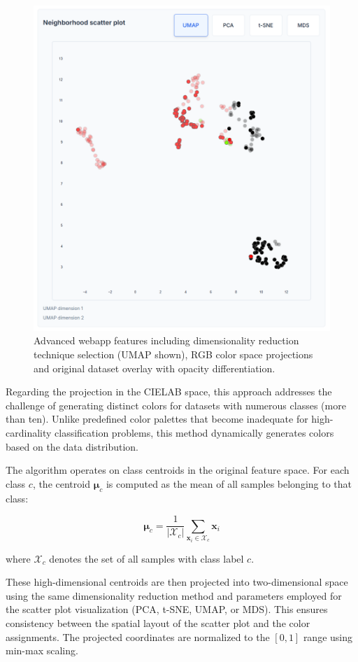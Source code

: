 \begin{figure}[h]
    \centering
    \includegraphics[width=0.6\linewidth]{images/DR switch and descendant highlight and various webapp.png}
    \caption{Advanced webapp features including dimensionality reduction technique selection (UMAP shown), RGB color space projections and original dataset overlay with opacity differentiation.}
    \label{fig:webappswitchdimensionalityandSplitNodeHighANdVarious}
\end{figure}

Regarding the projection in the CIELAB space, this approach addresses the challenge of generating distinct colors for datasets with numerous classes (more than ten). Unlike predefined color palettes that become inadequate for high-cardinality classification problems, this method dynamically generates colors based on the data distribution.

The algorithm operates on class centroids in the original feature space. For each class $c$, the centroid $\boldsymbol{\mu}_c$ is computed as the mean of all samples belonging to that class:

\begin{equation}
\boldsymbol{\mu}_c = \frac{1}{|\mathcal{X}_c|} \sum_{\mathbf{x}_i \in \mathcal{X}_c} \mathbf{x}_i
\end{equation}

where $\mathcal{X}_c$ denotes the set of all samples with class label $c$.

These high-dimensional centroids are then projected into two-dimensional space using the same dimensionality reduction method and parameters employed for the scatter plot visualization (PCA, t-SNE, UMAP, or MDS). This ensures consistency between the spatial layout of the scatter plot and the color assignments. The projected coordinates are normalized to the $[0, 1]$ range using min-max scaling.

